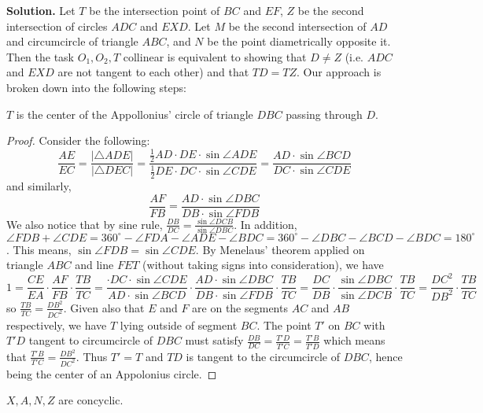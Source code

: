 \documentclass[11pt,a4paper]{article}
\begin{document}
\begin{enumerate}
		\textbf{Solution.} 
		Let $T$ be the intersection point of $BC$ and $EF$, $Z$ be the second intersection of circles $ADC$ and $EXD$. 
		Let $M$ be the second intersection of $AD$ and circumcircle of triangle $ABC$, 
		and $N$ be the point diametrically opposite it. 
		Then the task $O_1, O_2, T$ collinear is equivalent to showing that $D\neq Z$ (i.e. $ADC$ and $EXD$ are not tangent to each other) and that $TD=TZ$. 
		Our approach is broken down into the following steps: 
		
		\begin{lemma}
			\label{lemma_g7a}
			$T$ is the center of the Appollonius' circle of triangle $DBC$ passing through $D$. 
		\end{lemma}
	    \begin{proof}
	    	Consider the following: 
	    	\[
	    	\frac{AE}{EC}=\frac{|\triangle ADE|}{|\triangle DEC|}=\frac{\frac 12 AD\cdot DE\cdot \sin \angle ADE}{\frac 12 DE\cdot DC\cdot \sin \angle CDE}
	    	=\frac{AD\cdot \sin \angle BCD}{DC\cdot \sin \angle CDE}
	    	\]
	    	and similarly, 
	    	\[
	    	\frac{AF}{FB}=\frac{AD\cdot\sin \angle DBC}{DB\cdot\sin \angle FDB}
	    	\]
	    	We also notice that by sine rule, $\frac{DB}{DC}=\frac{\sin\angle DCB}{\sin\angle DBC}$. 
	    	In addition, $\angle FDB+\angle CDE=360^{\circ}-\angle FDA-\angle ADE-\angle BDC
	    	=360^{\circ}-\angle DBC-\angle BCD-\angle BDC=180^{\circ}$. 
	    	This means, $\sin \angle FDB=\sin\angle CDE$. 
	    	By Menelaus' theorem applied on triangle $ABC$ and line $FET$ (without taking signs into consideration), we have 
	    	\[
	    	1=\frac{CE}{EA}\cdot\frac{AF}{FB}\cdot\frac{TB}{TC}
	    	=\frac{\cdot DC\cdot \sin \angle CDE}{AD\cdot \sin \angle BCD}
	    	\cdot\frac{AD\cdot\sin \angle DBC}{DB\cdot\sin \angle FDB}
	    	\cdot\frac{TB}{TC}
	    	=\frac{DC}{DB}\cdot\frac{\sin \angle DBC}{\sin\angle DCB}\cdot \frac{TB}{TC}
	    	=\frac{DC^2}{DB^2}\cdot \frac{TB}{TC}
	    	\]
	    	so $\frac{TB}{TC}=\frac{DB^2}{DC^2}$. Given also that $E$ and $F$ are on the segments $AC$ and $AB$ respectively, we have $T$ lying outside of segment $BC$. The point $T'$ on $BC$ with $T'D$ tangent to circumcircle of $DBC$ must satisfy $\frac{DB}{DC}=\frac{T'D}{T'C}=\frac{T'B}{T'D}$ which means that $\frac{T'B}{T'C}=\frac{DB^2}{DC^2}$. Thus $T'=T$ and $TD$ is tangent to the circumcircle of $DBC$, hence being the center of an Appolonius circle. 
	    \end{proof}
        \begin{lemma}
        	\label{lemma_g7b}
        	$X, A, N, Z$ are concyclic. 
        \end{lemma}
        

\end{enumerate}
\end{document}
